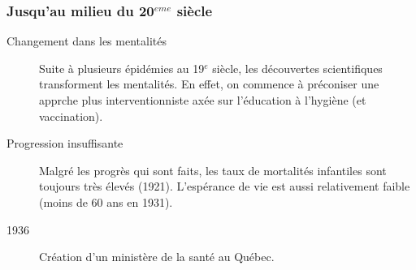\documentclass[10pt, french]{article}
\begin{document}
\begin{multicols*}{3}
\subsubsection*{Jusqu'au milieu du 20$^{eme}$ siècle}
\begin{description}
\item[Changement dans les mentalités]	Suite à plusieurs épidémies au 19$^{e}$ siècle, les découvertes scientifiques transforment les mentalités. En effet, on commence à préconiser une apprche plus interventionniste axée sur l'éducation à l'hygiène (et vaccination).
\item[Progression insuffisante] Malgré les progrès qui sont faits, les taux de mortalités infantiles sont toujours très élevés (1921). L'espérance de vie est aussi relativement faible (moins de 60 ans en 1931). 
\item[1936]	Création d'un ministère de la santé au Québec. 
\end{description}

\end{multicols*}
\end{document}
